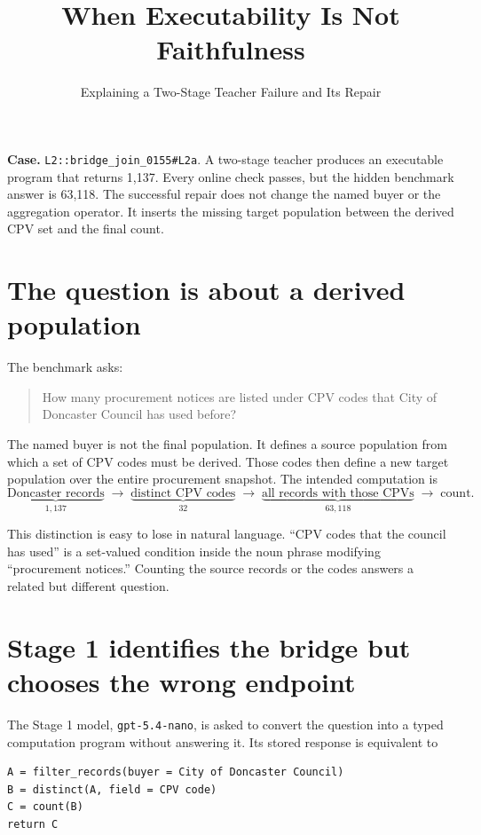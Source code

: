 \documentclass[10pt]{article}
\title{When Executability Is Not Faithfulness}
\author{Explaining a Two-Stage Teacher Failure and Its Repair}
\date{}
\newcommand{\artifact}[1]{\texttt{#1}}
\begin{document}
\maketitle

\begin{center}
\colorbox{softgray}{\parbox{0.90\linewidth}{\small
\textbf{Case.} \artifact{L2::bridge\_join\_0155\#L2a}.  A two-stage teacher produces an executable
program that returns 1,137.  Every online check passes, but the hidden benchmark answer is 63,118.
The successful repair does not change the named buyer or the aggregation operator.  It inserts the
missing target population between the derived CPV set and the final count.}}
\end{center}

\section{The question is about a derived population}

The benchmark asks:
\begin{quote}
How many procurement notices are listed under CPV codes that City of Doncaster Council has used
before?
\end{quote}

The named buyer is not the final population.  It defines a source population from which a set of CPV
codes must be derived.  Those codes then define a new target population over the entire procurement
snapshot.  The intended computation is
\[
\underbrace{\text{Doncaster records}}_{1{,}137}
\;\longrightarrow\;
\underbrace{\text{distinct CPV codes}}_{32}
\;\longrightarrow\;
\underbrace{\text{all records with those CPVs}}_{63{,}118}
\;\longrightarrow\;\text{count}.
\]

This distinction is easy to lose in natural language.  ``CPV codes that the council has used'' is a
set-valued condition inside the noun phrase modifying ``procurement notices.''  Counting the source
records or the codes answers a related but different question.

\section{Stage 1 identifies the bridge but chooses the wrong endpoint}

The Stage 1 model, \artifact{gpt-5.4-nano}, is asked to convert the question into a typed computation
program without answering it.  Its stored response is equivalent to
\begin{verbatim}
A = filter_records(buyer = City of Doncaster Council)
B = distinct(A, field = CPV code)
C = count(B)
return C
\end{verbatim}
\end{document}
